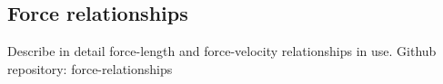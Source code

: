 \documentclass{sfuthesis}
\numberwithin{equation}{section}
\numberwithin{figure}{chapter}
\numberwithin{table}{chapter}
\theoremstyle{definition}
\begin{document}
\begin{appendices} %

\chapter{Force relationships} \label{app:force_relationships}

Describe in detail force-length and force-velocity relationships in use.
Github repository: force-relationships




\end{appendices}
\end{document}
